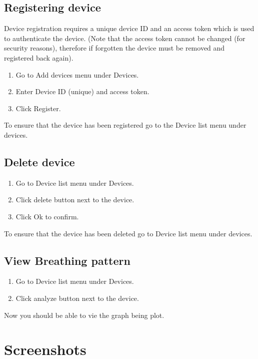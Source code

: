 \documentclass{article}
\begin{document}
\subsection{Registering device}

Device registration requires a unique device ID and an access token which is used to authenticate the device. (Note that the access token cannot be changed (for security reasons), therefore if forgotten the device must be removed and registered back again).

\begin{enumerate}
  \item Go to Add devices menu under Devices.
  \item Enter Device ID (unique) and access token.
  \item Click Register.
\end{enumerate}

To ensure that the device has been registered go to the Device list menu under devices.

\subsection{Delete device}

\begin{enumerate}
  \item Go to Device list menu under Devices.
  \item Click delete button next to the device.
  \item Click Ok to confirm.
\end{enumerate}

To ensure that the device has been deleted go to Device list menu under devices.

\subsection{View Breathing pattern}

\begin{enumerate}
  \item Go to Device list menu under Devices.
  \item Click analyze button next to the device.
\end{enumerate}

Now you should be able to vie the graph being plot.
\clearpage
\section{Screenshots}
\end{document}
